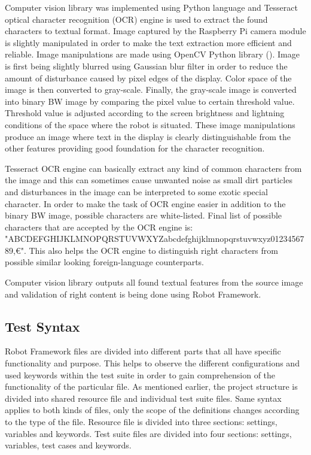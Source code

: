 Computer vision library was implemented using Python language and Tesseract optical character recognition (OCR) engine is used to extract the found characters to textual format. Image captured by the Raspberry Pi camera module is slightly manipulated in order to make the text extraction more efficient and reliable. Image manipulations are made using OpenCV Python library (\emph{\cite{opencv}}). Image is first being slightly blurred using Gaussian blur filter in order to reduce the amount of disturbance caused by pixel edges of the display. Color space of the image is then converted to gray-scale. Finally, the gray-scale image is converted into binary BW image by comparing the pixel value to certain threshold value. Threshold value is adjusted according to the screen brightness and lightning conditions of the space where the robot is situated. These image manipulations produce an image where text in the display is clearly distinguishable from the other features providing good foundation for the character recognition.

Tesseract OCR engine can basically extract any kind of common characters from the image and this can sometimes cause unwanted noise as small dirt particles and disturbances in the image can be interpreted to some exotic special character. In order to make the task of OCR engine easier in addition to the binary BW image, possible characters are white-listed. Final list of possible characters that are accepted by the OCR engine is: "ABCDEFGHIJKLMNOPQRSTUVWXYZabcdefghijklmnopqrstuvwxyz0123456789,\euro". This also helps the OCR engine to distinguish right characters from possible similar looking foreign-language counterparts.

Computer vision library outputs all found textual features from the source image and validation of right content is being done using Robot Framework. 

\subsection{Test Syntax}
\label{subsection:Test syntax}

Robot Framework files are divided into different parts that all have specific functionality and purpose. This helps to observe the different configurations and used keywords within the test suite in order to gain comprehension of the functionality of the particular file. As mentioned earlier, the project structure is divided into shared resource file and individual test suite files. Same syntax applies to both kinds of files, only the scope of the definitions changes according to the type of the file. Resource file is divided into three sections: settings, variables and keywords. Test suite files are divided into four sections: settings, variables, test cases and keywords.

